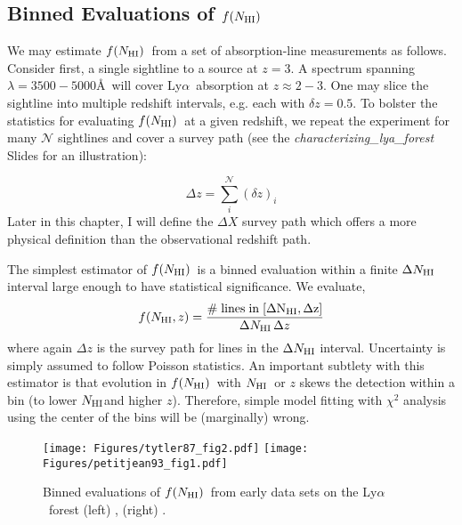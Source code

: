 \documentclass[graybox]{svmult}
\def\lya{Ly$\alpha$}
\def\smm{\sum\limits}
\newcommand{\mnhi}{N_{\rm HI}}
\newcommand{\nhi}{$\mnhi$}
\def\mfnhi{f(\mnhi)}
\def\fnhi{$\mfnhi$}
\begin{document}
\subsection{Binned Evaluations of \fnhi}
We may estimate \fnhi\ from a set of absorption-line 
measurements as follows. Consider first, a single sightline
to a source at $z=3$.  A spectrum spanning $\lambda = 3500-5000$\AA\
will cover \lya\ absorption at $z \approx 2-3$.
One may slice the sightline into multiple redshift intervals,
e.g. each with $\delta z = 0.5$.  To bolster the statistics
for evaluating \fnhi\ at a given redshift, we repeat the
experiment for many $\mathcal{N}$
sightlines and cover a survey path 
(see the {\it characterizing\_lya\_forest} Slides for
an illustration):

\begin{equation}
\Delta z = \smm_i^{\mathcal{N}} (\delta z)_i
\label{eqn:survey_path}
\end{equation}
Later in this chapter,
I will define the $\Delta X$ survey path which offers
a more physical definition than the observational redshift path.

The simplest estimator of \fnhi\ is a binned evaluation
within a finite $\Delta \mnhi$ interval
large enough to have statistical significance.
We evaluate,
\begin{equation}
f(\mnhi,z) = \frac{\rm \# \; lines \; in \; [\Delta \mnhi,\Delta z]}{
\Delta\mnhi \, \Delta z}
 \end{equation}
where again $\Delta z$ is the survey path for lines
in the $\Delta \mnhi$ interval.  Uncertainty is simply
assumed to follow Poisson statistics. 
An important subtlety with this estimator is that 
evolution in \fnhi\ with \nhi\ or $z$ 
skews the detection within a bin (to lower \nhi and higher $z$).
Therefore, simple model fitting with $\chi^2$ analysis using the 
center of the bins will be (marginally) wrong.

%
\begin{figure}[b]
\sidecaption
\texttt{[image: Figures/tytler87\_fig2.pdf]}
\texttt{[image: Figures/petitjean93\_fig1.pdf]}
%
\caption{Binned evaluations of \fnhi\ from early data sets
on the \lya\ forest (left) \cite{tytler87}, (right) \cite{petit93}.
}
\label{fig:binfN}       %
\end{figure}
\end{document}
